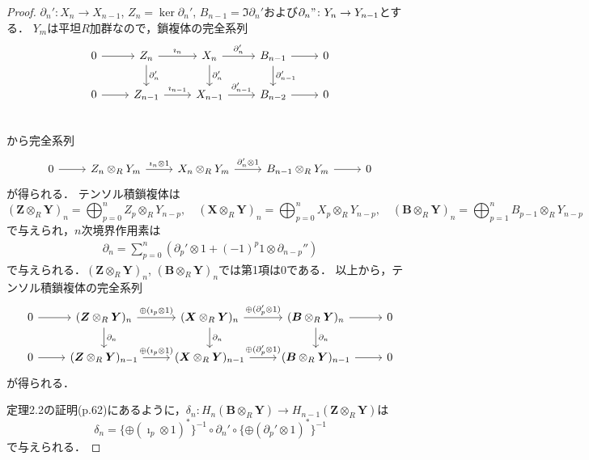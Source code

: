 \begin{proof}
  $\partial_n' \colon X_n \to X_{n-1}$, $Z_n = \ker \partial_n'$, $B_{n-1} = \Im \partial_n'$および$\partial_n" \colon Y_n \to Y_{n-1}$とする．
  $Y_m$は平坦$R$加群なので，鎖複体の完全系列
  \[
  \begin{tikzcd}
    0 \arrow[r] & Z_n \arrow[r, "\imath_n"]\arrow[d, "\partial_n'"] & X_n \arrow[r, "\partial_n'"]\arrow[d, "\partial_n'"] & B_{n-1} \arrow[r]\arrow[d, "\partial_{n-1}'"] & 0 \\
    0 \arrow[r] & Z_{n-1} \arrow[r, "\imath_{n-1}"] & X_{n-1} \arrow[r, "\partial_{n-1}'"] & B_{n-2} \arrow[r] & 0 \\
  \end{tikzcd}
  \]
  から完全系列
  \[
  \begin{tikzcd}
    0 \arrow[r] & Z_n \otimes_R Y_m \arrow[r, "\imath_n \otimes 1"] & X_n \otimes_R Y_m \arrow[r, "\partial_n' \otimes 1"] & B_{n-1}  \otimes_R Y_m \arrow[r] & 0
  \end{tikzcd}
  \]
  が得られる．
  テンソル積鎖複体は
  \[ (\boldsymbol{Z} \otimes_R \boldsymbol{Y})_n = \bigoplus_{p=0}^n Z_p \otimes_R Y_{n-p}, \quad (\boldsymbol{X} \otimes_R \boldsymbol{Y})_n = \bigoplus_{p=0}^n X_p \otimes_R Y_{n-p}, \quad (\boldsymbol{B} \otimes_R \boldsymbol{Y})_n = \bigoplus_{p=1}^n B_{p-1} \otimes_R Y_{n-p} \]
  で与えられ，$n$次境界作用素は
  \begin{align*}
    \partial_n = \sum_{p=0}^n \left( \partial_p' \otimes 1 + (-1)^p 1 \otimes \partial_{n-p}'' \right)
  \end{align*}
  で与えられる．$(\boldsymbol{Z} \otimes_R \boldsymbol{Y})_n$, $(\boldsymbol{B} \otimes_R \boldsymbol{Y})_n$では第1項は$0$である．
  以上から，テンソル積鎖複体の完全系列
  \[
  \begin{tikzcd}
    0 \arrow[r]
    & (\boldsymbol{Z} \otimes_R \boldsymbol{Y})_n \arrow[r, "\oplus(\imath_p \otimes 1)"]\arrow[d, "\partial_n"]
    & (\boldsymbol{X} \otimes_R \boldsymbol{Y})_n \arrow[r, "\oplus(\partial_p' \otimes 1)"]\arrow[d, "\partial_n"]
    & (\boldsymbol{B} \otimes_R \boldsymbol{Y})_n \arrow[r]\arrow[d, "\partial_n"]
    & 0 \\
    0 \arrow[r] & (\boldsymbol{Z} \otimes_R \boldsymbol{Y})_{n-1} \arrow[r, "\oplus(\imath_p \otimes 1)"] & (\boldsymbol{X} \otimes_R \boldsymbol{Y})_{n-1} \arrow[r, "\oplus(\partial_p' \otimes 1)"] & (\boldsymbol{B} \otimes_R \boldsymbol{Y})_{n-1} \arrow[r] & 0
  \end{tikzcd}
  \]
  が得られる．

  定理2.2の証明(p.62)にあるように，$\delta_n \colon H_n(\boldsymbol{B} \otimes_R \boldsymbol{Y}) \to H_{n-1}(\boldsymbol{Z} \otimes_R \boldsymbol{Y})$は
  \[ \delta_n = \{\oplus(\imath_p \otimes 1)^\ast\}^{-1} \circ \partial_n' \circ \{\oplus(\partial_p' \otimes 1)^\ast\}^{-1} \]
  で与えられる．


\end{proof}
